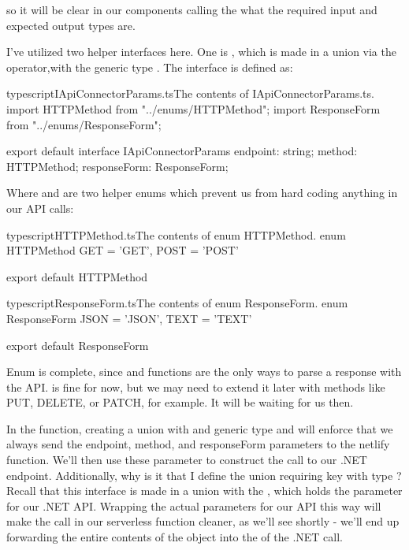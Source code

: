 \documentclass[a4paper,headinclude=on,footinclude=on,12pt,oneside]{scrbook}
\begin{document}
so it will be clear in our components calling the  what the required input and expected output types are.

I've utilized two helper interfaces here. One is , which is made in a union via the \codeword{\&} operator,with the generic type . The  interface is defined as:

\begin{codeInput}{typescript}{IApiConnectorParams.ts}{The contents of IApiConnectorParams.ts.}
import HTTPMethod from "../enums/HTTPMethod";
import ResponseForm from "../enums/ResponseForm";

export default interface IApiConnectorParams {
  endpoint: string;
  method: HTTPMethod;
  responseForm: ResponseForm;
}
\end{codeInput}

Where  and  are two helper enums which prevent us from hard coding anything in our API calls:

\begin{codeInput}{typescript}{HTTPMethod.ts}{The contents of enum HTTPMethod.}
enum HTTPMethod {
  GET = 'GET',
  POST = 'POST'
}

export default HTTPMethod
\end{codeInput}

\begin{codeInput}{typescript}{ResponseForm.ts}{The contents of enum ResponseForm.}
enum ResponseForm {
  JSON = 'JSON',
  TEXT = 'TEXT'
}

export default ResponseForm
\end{codeInput}

Enum  is complete, since  and  functions are the only ways to parse a response with the  API.  is fine for now, but we may need to extend it later with methods like PUT, DELETE, or PATCH, for example. It will be waiting for us then.

In the  function, creating a union with  and generic type  and will enforce that we always send the endpoint, method, and responseForm parameters to the netlify  function. We'll then use these parameter to construct the call to our .NET endpoint. Additionally, why is it that I define the union requiring key  with type ? Recall that this interface is made in a union with the , which holds the  parameter for our .NET API. Wrapping the actual parameters for our API this way will make the call in our serverless function cleaner, as we'll see shortly - we'll end up forwarding the entire contents of the  object into the  of the .NET call.
\end{document}
